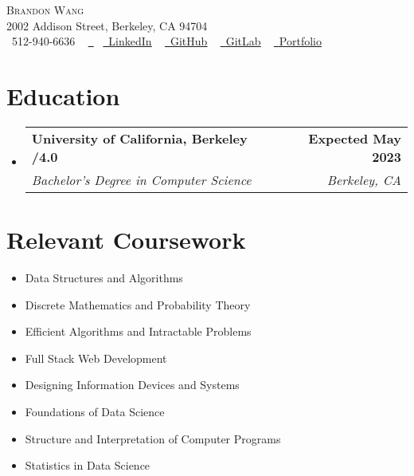 \documentclass[letterpaper,11pt]{article}
\makeatletter
\newcommand{\resumeSubheading}[4]{
  \vspace{-2pt}\item
    \begin{tabular*}{1.0\textwidth}[t]{l@{\extracolsep{\fill}}r}
      \textbf{#1} & \textbf{\small #2} \\
      \textit{\small#3} & \textit{\small #4} \\
    \end{tabular*}\vspace{-7pt}
}
\newcommand{\resumeSubHeadingListStart}{\begin{itemize}[leftmargin=0.0in, label={}]}
\newcommand{\resumeSubHeadingListEnd}{\end{itemize}}
\makeatother
\begin{document}
\begin{center}
\vspace*{-0.5cm}
    {\Huge \scshape Brandon Wang} \\ \vspace{1pt}
    \small 2002 Addison Street, Berkeley, CA 94704 \\ \vspace{4pt}
    \footnotesize \raisebox{-0.1\height}\faPhone\ 512-940-6636 ~ \href{mailto:wangb@berkeley.edu}{\raisebox{-0.2\height}\faEnvelope\  \underline{}}~
    \href{https://www.linkedin.com/in/brandon-m-wang}{\raisebox{-0.2\height}\faLinkedin\ \underline{LinkedIn}}  ~
    \href{https://github.com/brandon-m-wang}{\raisebox{-0.2\height}\faGithub\ \underline{GitHub}} ~
    \href{https://gitlab.com/brandonmwang}{\raisebox{-0.2\height}\faGitlab\ \underline{GitLab}}
    \vspace{-8pt} ~
    \href{http://brandonwan.gg/}{\raisebox{-0.2\height}\faSuitcase\ \underline{Portfolio}}
    \vspace{-8pt}
\end{center}


\vspace{-1mm} 
\section{Education}
\resumeSubHeadingListStart
    \resumeSubheading
      {University of California, Berkeley \fontseries{m}\selectfont4.0/4.0}{Expected May 2023}
      {Bachelor's Degree in Computer Science}{Berkeley, CA}
\vspace{-2.25mm}
\resumeSubHeadingListEnd

\section{Relevant Coursework}
        \begin{multicols}{4}
            \begin{itemize}[itemsep=0pt, parsep=3pt]
            \linespread{-0.5pt}
            \small
                \item Data Structures and Algorithms
                \item Discrete Mathematics and Probability Theory
                \item Efficient Algorithms and Intractable Problems
                \item Full Stack Web Development
                \item Designing Information Devices and Systems
                \item Foundations of Data Science
                \item Structure and Interpretation of Computer Programs
                \item Statistics in Data Science
            \end{itemize}
        \end{multicols}
\end{document}
